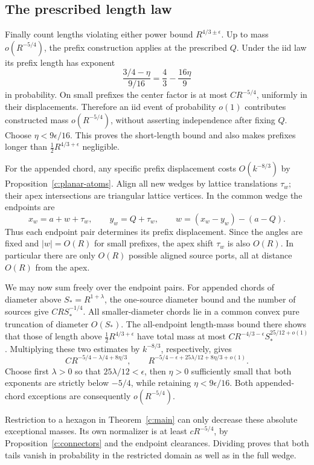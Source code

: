 \documentclass[11pt]{article}
\numberwithin{equation}{section}
\theoremstyle{definition}\newtheorem{definition}[theorem]{Definition}
\theoremstyle{remark}\newtheorem{remark}[theorem]{Remark}
\begin{document}
\subsection{The prescribed length law}
Finally count lengths violating either power bound
\(R^{4/3\pm\epsilon}\). Up to mass \(o(R^{-5/4})\), the prefix
construction applies at the prescribed \(Q\). Under the iid law its
prefix length has exponent
\[
 \frac{3/4-\eta}{9/16}=\frac43-\frac{16\eta}{9}
\]
in probability. On small prefixes the center factor is at most
\(CR^{-5/4}\), uniformly in their displacements. Therefore an iid
event of probability \(o(1)\) contributes constructed mass
\(o(R^{-5/4})\), without asserting independence after fixing \(Q\).
Choose \(\eta<9\epsilon/16\). This proves the short-length bound
and also makes prefixes longer than \(\frac12R^{4/3+\epsilon}\)
negligible.

For the appended chord, any specific prefix displacement costs
\(O(k^{-8/3})\) by Proposition~\ref{c:planar-atoms}. Align all new
wedges by lattice translations \(\tau_w\); their apex intersections
are triangular lattice vertices. In the common wedge the endpoints are
\[
 x_w=a+w+\tau_w,\qquad y_w=Q+\tau_w,
 \qquad w=(x_w-y_w)-(a-Q).
\]
Thus each endpoint pair determines its prefix displacement. Since the
angles are fixed and \(|w|=O(R)\) for small prefixes, the apex shift
\(\tau_w\) is also \(O(R)\). In particular there are only \(O(R)\)
possible aligned source ports, all at distance \(O(R)\) from the apex.

We may now sum freely over the endpoint pairs. For appended chords
of diameter above \(S_*=R^{1+\lambda}\), the one-source diameter
bound and the number of sources give \(CRS_*^{-1/4}\).
All smaller-diameter chords lie in a common convex pure truncation of
diameter \(O(S_*)\). The all-endpoint length-mass bound there shows
that those of length above \(\frac12R^{4/3+\epsilon}\) have total mass
at most \(CR^{-4/3-\epsilon}S_*^{25/12+o(1)}\).
Multiplying these two estimates by \(k^{-8/3}\), respectively, gives
\[
 CR^{-5/4-\lambda/4+8\eta/3},\qquad
 R^{-5/4-\epsilon+25\lambda/12+8\eta/3+o(1)}.
\]
Choose first \(\lambda>0\) so that \(25\lambda/12<\epsilon\), then
\(\eta>0\) sufficiently small that both exponents are strictly below
\(-5/4\), while retaining \(\eta<9\epsilon/16\). Both appended-chord
exceptions are consequently \(o(R^{-5/4})\).



Restriction to a hexagon in Theorem~\ref{c:main} can only decrease
these absolute exceptional masses. Its own normalizer is at least
\(cR^{-5/4}\), by Proposition~\ref{c:connectors} and the endpoint
clearances. Dividing proves that both tails vanish in probability
in the restricted domain as well as in the full wedge.
\end{document}
